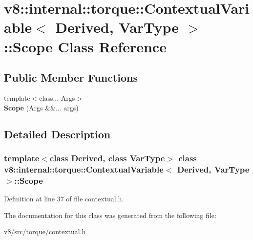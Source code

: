 \hypertarget{classv8_1_1internal_1_1torque_1_1ContextualVariable_1_1Scope}{}\section{v8\+:\+:internal\+:\+:torque\+:\+:Contextual\+Variable$<$ Derived, Var\+Type $>$\+:\+:Scope Class Reference}
\label{classv8_1_1internal_1_1torque_1_1ContextualVariable_1_1Scope}
\subsection*{Public Member Functions}
\begin{DoxyCompactItemize}
\item 
\mbox{\label{classv8_1_1internal_1_1torque_1_1ContextualVariable_1_1Scope_a24420514628846ce48299d9d7c7581b7}} 
{\footnotesize template$<$class... Args$>$ }\\{\bfseries Scope} (Args \&\&... args)
\end{DoxyCompactItemize}


\subsection{Detailed Description}
\subsubsection*{template$<$class Derived, class Var\+Type$>$\newline
class v8\+::internal\+::torque\+::\+Contextual\+Variable$<$ Derived, Var\+Type $>$\+::\+Scope}



Definition at line 37 of file contextual.\+h.



The documentation for this class was generated from the following file\+:\begin{DoxyCompactItemize}
\item 
v8/src/torque/contextual.\+h\end{DoxyCompactItemize}
